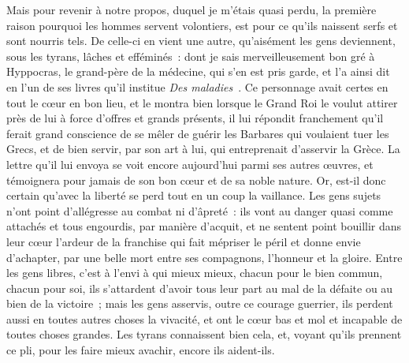 \documentclass[french,twoside]{book} %
\begin{document}
Mais pour revenir à notre propos, duquel je m’étais quasi perdu, la première raison pourquoi les hommes servent volontiers, est pour ce qu’ils naissent serfs et sont nourris tels. De celle-ci en vient une autre, qu’aisément les gens deviennent, sous les tyrans, lâches et efféminés : dont je sais merveilleusement bon gré à Hyppocras, le grand-père de la médecine, qui s’en est pris garde, et l’a ainsi dit en l’un de ses livres qu’il institue \emph{Des maladies} . Ce personnage avait certes en tout le cœur en bon lieu, et le montra bien lorsque le Grand Roi le voulut attirer près de lui à force d’offres et grands présents, il lui répondit franchement qu’il ferait grand conscience de se mêler de guérir les Barbares qui voulaient tuer les Grecs, et de bien servir, par son art à lui, qui entreprenait d’asservir la Grèce. La lettre qu’il lui envoya se voit encore aujourd’hui parmi ses autres œuvres, et témoignera pour jamais de son bon cœur et de sa noble nature. Or, est-il donc certain qu’avec la liberté se perd tout en un coup la vaillance. Les gens sujets n’ont point d’allégresse au combat ni d’âpreté : ils vont au danger quasi comme attachés et tous engourdis, par manière d’acquit, et ne sentent point bouillir dans leur cœur l’ardeur de la franchise qui fait mépriser le péril et donne envie d’achapter, par une belle mort entre ses compagnons, l’honneur et la gloire. Entre les gens libres, c’est à l’envi à qui mieux mieux, chacun pour le bien commun, chacun pour soi, ils s’attardent d’avoir tous leur part au mal de la défaite ou au bien de la victoire ; mais les gens asservis, outre ce courage guerrier, ils perdent aussi en toutes autres choses la vivacité, et ont le cœur bas et mol et incapable de toutes choses grandes. Les tyrans connaissent bien cela, et, voyant qu’ils prennent ce pli, pour les faire mieux avachir, encore ils aident-ils.\par
\end{document}
